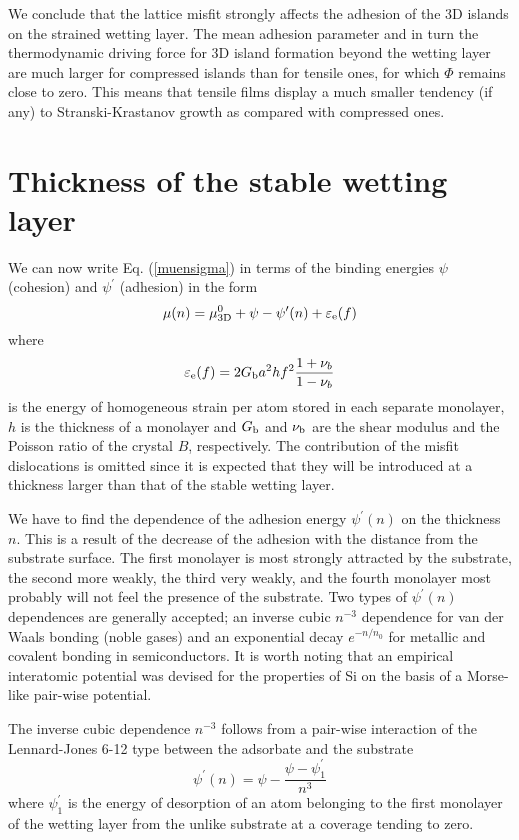 \documentclass[aps,prl,showpacs,twocolumn,byrevtex,floatfix]{revtex4-1}
\begin{document}
We conclude that the lattice misfit strongly affects the adhesion of the 3D
islands on the strained wetting layer. The mean adhesion parameter and in turn
the thermodynamic driving force for 3D island formation beyond the wetting
layer are much larger for compressed islands than for tensile ones, for which
$\Phi$ remains close to zero. This means that tensile films display a much 
smaller tendency (if any) to Stranski-Krastanov growth as compared with 
compressed ones.


\section{Thickness of the stable wetting layer}

We can now write Eq. (\ref{muensigma}) in terms of the binding energies $\psi$
(cohesion) and $\psi^{\prime}$ (adhesion) in the form
\begin{equation}\label{muenpsi}
\mu (n) = \mu^0_{\rm 3D} + \psi - \psi^{\prime}(n) + \varepsilon_{\rm e}(f)
\end{equation}
where
\begin{equation}\label{strain}
 \varepsilon_{\rm e}(f) = 2G_{\rm b}a^2 h f^2 \frac{1+\nu_b}{1-\nu_b}
\end{equation}
is the energy of homogeneous strain per atom stored in each separate monolayer,
$h$ is the thickness of a monolayer and $G_{\rm b}$ and $\nu_{\rm b}$ are the
shear modulus and the Poisson ratio of the crystal $B$, respectively.
The contribution of the misfit dislocations is omitted since it is
expected that they will be introduced at a thickness larger than that
of the stable wetting layer.

We have to find the dependence of the adhesion energy $\psi^{\prime}(n)$ on 
the thickness $n$. This is a result of the decrease of the adhesion with
the distance from the substrate surface. The first monolayer is most strongly
attracted by the substrate, the second more weakly, the third very weakly, and
the fourth monolayer most probably will not feel the presence of the substrate.
Two types of $\psi^{\prime}(n)$ dependences are generally accepted;
an inverse cubic $n^{-3}$ dependence for van der Waals bonding (noble gases)
and an exponential decay $e^{-n/n_0}$ for metallic and covalent bonding in
semiconductors.\cite{Muller96} It is worth noting that an empirical interatomic
potential was devised for the properties of Si on the basis of a Morse-like
pair-wise potential.\cite{Tersoff86}

The inverse cubic dependence $n^{-3}$ follows from a pair-wise interaction of
the Lennard-Jones 6-12 type between the adsorbate and the
substrate\cite{Dash77,Mutaftschiev01}
\begin{equation}\label{psien}
\psi^{\prime}(n) = \psi - \frac{\psi - \psi^{\prime}_1}{n^3}
\end{equation}
where $\psi^{\prime}_1$ is the energy of desorption of an atom belonging to
the first monolayer of the wetting layer from the unlike substrate at a
coverage tending to zero.
\end{document}
